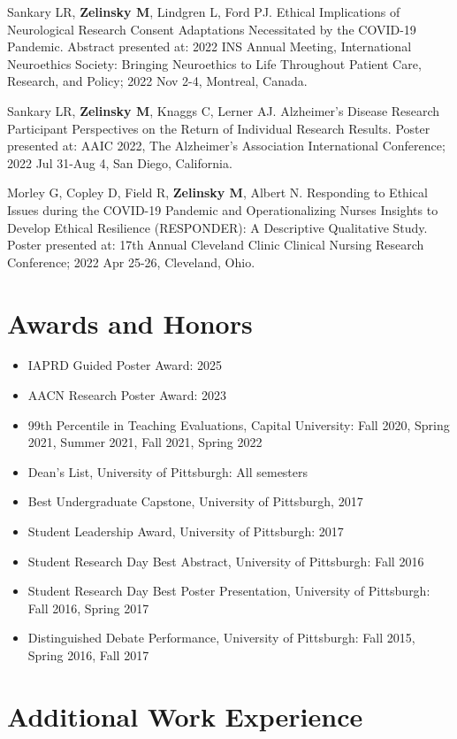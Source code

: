 \documentclass[
  letterpaper,
  DIV=11,
  numbers=noendperiod]{scrartcl}
\providecommand{\tightlist}{%
  \setlength{\itemsep}{0pt}\setlength{\parskip}{0pt}}\usepackage{longtable,booktabs,array}
\begin{document}
Sankary LR, \textbf{Zelinsky M}, Lindgren L, Ford PJ. Ethical
Implications of Neurological Research Consent Adaptations Necessitated
by the COVID-19 Pandemic. Abstract presented at: 2022 INS Annual
Meeting, International Neuroethics Society: Bringing Neuroethics to Life
Throughout Patient Care, Research, and Policy; 2022 Nov 2-4, Montreal,
Canada.

Sankary LR, \textbf{Zelinsky M}, Knaggs C, Lerner AJ. Alzheimer's
Disease Research Participant Perspectives on the Return of Individual
Research Results. Poster presented at: AAIC 2022, The Alzheimer's
Association International Conference; 2022 Jul 31-Aug 4, San Diego,
California.

Morley G, Copley D, Field R, \textbf{Zelinsky M}, Albert N. Responding
to Ethical Issues during the COVID-19 Pandemic and Operationalizing
Nurses Insights to Develop Ethical Resilience (RESPONDER): A Descriptive
Qualitative Study. Poster presented at: 17th Annual Cleveland Clinic
Clinical Nursing Research Conference; 2022 Apr 25-26, Cleveland, Ohio.

\section{Awards and Honors}\label{awards-and-honors}

\begin{itemize}
\tightlist
\item
  IAPRD Guided Poster Award: 2025
\item
  AACN Research Poster Award: 2023
\item
  99th Percentile in Teaching Evaluations, Capital University: Fall
  2020, Spring 2021, Summer 2021, Fall 2021, Spring 2022
\item
  Dean's List, University of Pittsburgh: All semesters
\item
  Best Undergraduate Capstone, University of Pittsburgh, 2017
\item
  Student Leadership Award, University of Pittsburgh: 2017
\item
  Student Research Day Best Abstract, University of Pittsburgh: Fall
  2016
\item
  Student Research Day Best Poster Presentation, University of
  Pittsburgh: Fall 2016, Spring 2017
\item
  Distinguished Debate Performance, University of Pittsburgh: Fall 2015,
  Spring 2016, Fall 2017
\end{itemize}

\section{Additional Work Experience}\label{additional-work-experience}
\end{document}
